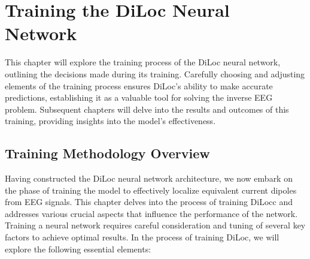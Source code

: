 \documentclass[a4paper, UKenglish, 11pt]{uiomaster}
\begin{document}
\rednote{}
\chapter{Training the DiLoc Neural Network}
This chapter will explore the training process of the DiLoc neural network, outlining the decisions made during its training. Carefully choosing and adjusting elements of the training process ensures DiLoc's ability to make accurate predictions, establishing it as a valuable tool for solving the inverse EEG problem. Subsequent chapters will delve into the results and outcomes of this training, providing insights into the model's effectiveness.

\section{Training Methodology Overview}
Having constructed the DiLoc neural network architecture, we now embark on the phase of training the model to effectively localize equivalent current dipoles from EEG signals. This chapter delves into the process of training DiLocc and addresses various crucial aspects that influence the performance of the network. Training a neural network requires careful consideration and tuning of several key factors to achieve optimal results. In the process of training DiLoc, we will explore the following essential elements:
\end{document}
